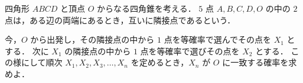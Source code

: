 \documentclass[../../main.tex]{subfiles}
\begin{document}
四角形 $ABCD$ と頂点 $O$ からなる四角錐を考える．
$5$ 点 $A, B, C, D, O$ の中の $2$ 点は，ある辺の両端にあるとき，互いに隣接点であるという．

今，$O$ から出発し，その隣接点の中から $1$ 点を等確率で選んでその点を $X_1$ とする．
次に $X_1$ の隣接点の中から $1$ 点を等確率で選びその点を $X_2$ とする．
この様にして順次 $X_1, X_2, X_3, \dots, X_n$ を定めるとき，$X_n$ が $O$ に一致する確率を求めよ．
\end{document}
